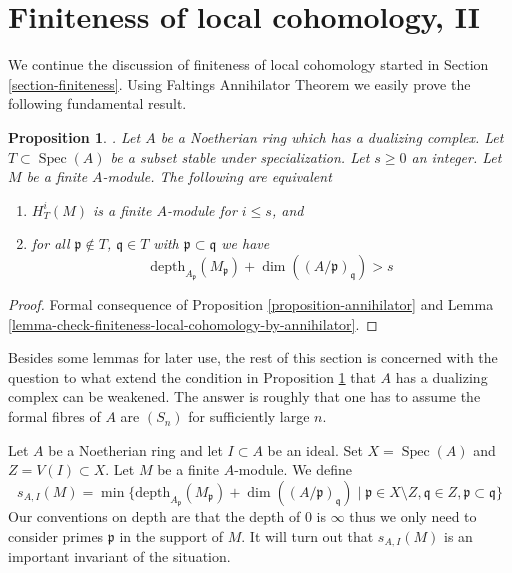 \documentclass{stacks-project}
\newenvironment{reference}{\comment}{\endcomment}
\theoremstyle{plain}
\newtheorem{proposition}[subsection]{Proposition}
\theoremstyle{definition}
\theoremstyle{remark}
\numberwithin{equation}{subsection}
\def\Spec{\mathop{\mathrm{Spec}}}
\begin{document}
\section{Finiteness of local cohomology, II}
\label{section-finiteness-II}

\noindent
We continue the discussion of finiteness of local cohomology started in
Section \ref{section-finiteness}. Using
Faltings Annihilator Theorem
we easily prove the following fundamental result.

\begin{proposition}
\label{proposition-finiteness}
\begin{reference}
\cite{Faltings-annulators}.
\end{reference}
Let $A$ be a Noetherian ring which has a dualizing complex.
Let $T \subset \Spec(A)$ be a subset stable under specialization.
Let $s \geq 0$ an integer. Let $M$ be a finite $A$-module.
The following are equivalent
\begin{enumerate}
\item $H^i_T(M)$ is a finite $A$-module for $i \leq s$, and
\item for all $\mathfrak p \not \in T$, $\mathfrak q \in T$ with
$\mathfrak p \subset \mathfrak q$ we have
$$
\text{depth}_{A_\mathfrak p}(M_\mathfrak p) +
\dim((A/\mathfrak p)_\mathfrak q) > s
$$
\end{enumerate}
\end{proposition}

\begin{proof}
Formal consequence of Proposition \ref{proposition-annihilator} and
Lemma \ref{lemma-check-finiteness-local-cohomology-by-annihilator}.
\end{proof}

\noindent
Besides some lemmas for later use, the rest of this section is
concerned with the question to what extend the condition in
Proposition \ref{proposition-finiteness}
that $A$ has a dualizing complex can be weakened. The answer is roughly
that one has to assume the formal fibres of $A$ are $(S_n)$
for sufficiently large $n$.

\medskip\noindent
Let $A$ be a Noetherian ring and let $I \subset A$ be an ideal.
Set $X = \Spec(A)$ and $Z = V(I) \subset X$. Let $M$ be a finite $A$-module.
We define
\begin{equation}
\label{equation-cutoff}
s_{A, I}(M) =
\min \{
\text{depth}_{A_\mathfrak p}(M_\mathfrak p) + \dim((A/\mathfrak p)_\mathfrak q)
\mid
\mathfrak p \in X \setminus Z, \mathfrak q \in Z,
\mathfrak p \subset \mathfrak q
\}
\end{equation}
Our conventions on depth are that the depth of $0$ is $\infty$
thus we only need to consider primes $\mathfrak p$ in the support
of $M$. It will turn out that $s_{A, I}(M)$ is an important invariant of
the situation.
\end{document}
